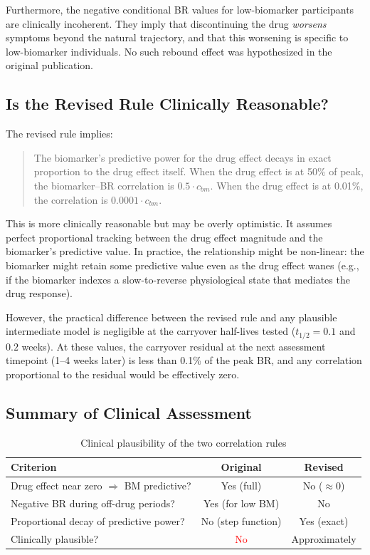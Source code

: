 \documentclass[11pt]{article}
\begin{document}
Furthermore, the negative conditional BR values for
low-biomarker participants are clinically incoherent. They
imply that discontinuing the drug \emph{worsens} symptoms
beyond the natural trajectory, and that this worsening is
specific to low-biomarker individuals. No such rebound effect
was hypothesized in the original publication.

\subsection{Is the Revised Rule Clinically Reasonable?}

The revised rule implies:

\begin{quote}
The biomarker's predictive power for the drug effect decays
in exact proportion to the drug effect itself. When the drug
effect is at 50\% of peak, the biomarker--BR correlation is
$0.5 \cdot c_{bm}$. When the drug effect is at 0.01\%,
the correlation is $0.0001 \cdot c_{bm}$.
\end{quote}

This is more clinically reasonable but may be overly
optimistic. It assumes perfect proportional tracking between
the drug effect magnitude and the biomarker's predictive
value. In practice, the relationship might be non-linear:
the biomarker might retain some predictive value even as
the drug effect wanes (e.g., if the biomarker indexes a
slow-to-reverse physiological state that mediates the drug
response).

However, the practical difference between the revised rule
and any plausible intermediate model is negligible at the
carryover half-lives tested ($t_{1/2} = 0.1$ and $0.2$
weeks). At these values, the carryover residual at the next
assessment timepoint (1--4 weeks later) is less than 0.1\%
of the peak BR, and any correlation proportional to the
residual would be effectively zero.

\subsection{Summary of Clinical Assessment}

\begin{table}[h]
\centering
\caption{Clinical plausibility of the two correlation rules}
\begin{tabular}{lcc}
\toprule
Criterion & Original & Revised \\
\midrule
Drug effect near zero $\Rightarrow$ BM predictive?
  & Yes (full) & No ($\approx 0$) \\
Negative BR during off-drug periods?
  & Yes (for low BM) & No \\
Proportional decay of predictive power?
  & No (step function) & Yes (exact) \\
Clinically plausible?
  & \textcolor{red}{No} & Approximately \\
\bottomrule
\end{tabular}
\end{table}
\end{document}

